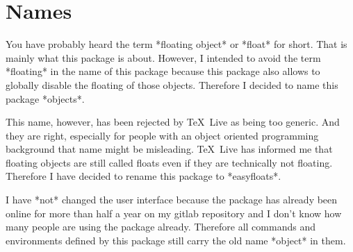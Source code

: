 
\section{Names}
\label{names}

You have probably heard the term *floating object* or *float* for short.
That is mainly what this package is about.
However, I intended to avoid the term *floating* in the name of this package because this package also allows
to globally disable the floating of those objects.
Therefore I decided to name this package *objects*.

This name, however, has been rejected by \TeX\ Live as being too generic.
And they are right, especially for people with an object oriented programming background that name might be misleading.
\TeX\ Live has informed me that floating objects are still called floats even if they are technically not floating.
Therefore I have decided to rename this package to *easyfloats*.

I have *not* changed the user interface because the package has already been online for more than half a year on my gitlab repository and I don't know how many people are using the package already.
Therefore all commands and environments defined by this package still carry the old name *object* in them.
